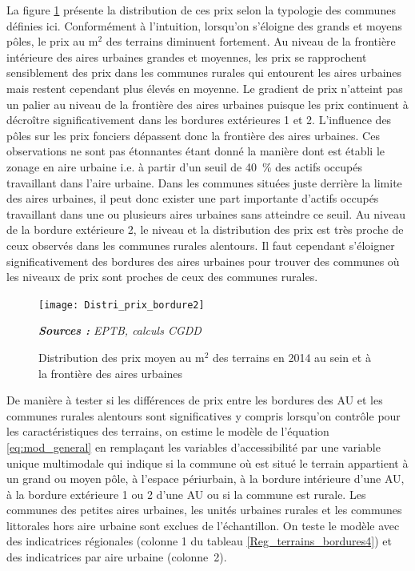 \documentclass[10.5pt,a4paper]{article}
\begin{document}
{La figure \ref{Distri_prix_bordure} présente la distribution de ces prix selon la typologie des communes définies ici.  Conformément à l'intuition, lorsqu'on s'éloigne des grands et moyens pôles, le prix au m$^2$ des terrains diminuent fortement. Au niveau de la frontière intérieure des aires urbaines grandes et moyennes, les prix se rapprochent sensiblement des prix dans les communes rurales qui entourent les aires urbaines mais restent cependant plus élevés en moyenne. Le gradient de prix n'atteint pas un palier au niveau de la frontière des aires urbaines puisque les prix continuent à décroître significativement dans les bordures extérieures 1 et 2. L'influence des pôles sur les prix fonciers dépassent donc la frontière des aires urbaines. Ces observations ne sont pas étonnantes étant donné la manière dont est établi le zonage en aire urbaine i.e. à partir d'un seuil de 40~\% des actifs occupés travaillant dans l'aire urbaine. Dans les communes situées juste derrière la limite des aires urbaines, il peut donc exister une part importante d'actifs occupés
travaillant dans une ou plusieurs aires urbaines sans atteindre ce seuil. Au niveau de la bordure extérieure 2, le niveau et la distribution des prix est très proche de ceux observés dans les communes rurales alentours. Il faut cependant s'éloigner significativement des bordures des aires urbaines pour trouver des communes où les niveaux de prix sont proches de ceux des communes rurales. \par
 
\begin{figure}[!h]%
\begin{center}
\caption{Distribution des prix moyen au m$^2$ des terrains en 2014 au sein et à la frontière des aires urbaines}%
\label{Distri_prix_bordure}%
\texttt{[image: Distri\_prix\_bordure2]}%
\end{center}
\scriptsize \textit{\textbf{Sources :} EPTB, calculs CGDD}
\end{figure}



\newpage

De manière à tester si les différences de prix entre les bordures des AU et les communes rurales alentours sont significatives y compris lorsqu'on contrôle pour les caractéristiques des terrains, on estime le 
modèle de l'équation \ref{eq:mod_general} en remplaçant les variables d'accessibilité par une variable unique multimodale qui indique si la commune où est situé le terrain appartient à un grand ou moyen pôle, à l'espace périurbain, à la bordure intérieure d'une AU, à la bordure extérieure 1 ou 2 d'une AU ou si la commune est rurale.  Les communes des petites aires urbaines, les unités urbaines rurales et les communes littorales hors aire urbaine sont exclues de l'échantillon. On teste le modèle avec des indicatrices régionales (colonne 1 du tableau \ref{Reg_terrains_bordures4})  et des indicatrices par aire urbaine (colonne~2).\par

}
\end{document}
